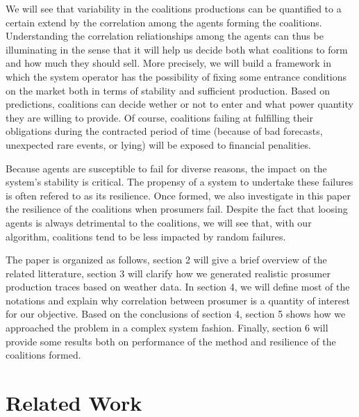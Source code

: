 \documentclass[conference]{IEEEtran}
\begin{document}
We will see that variability in the coalitions productions can be quantified to a certain extend by the correlation among the agents forming the coalitions. Understanding the correlation reliationships among the agents can thus be illuminating in the sense that it will help us decide both what coalitions to form and how much they should sell. More precisely, we will build a framework in which the system operator has the possibility of fixing some entrance conditions on the market both in terms of stability and sufficient production. Based on predictions, coalitions can decide wether or not to enter and what power quantity they are willing to provide. Of course, coalitions failing at fulfilling their obligations during the contracted period of time (because of bad forecasts, unexpected rare events, or lying) will be exposed to financial penalities.

Because agents are susceptible to fail for diverse reasons, the impact on the system's stability is critical. The propensy of a system to undertake these failures is often refered to as its resilience. Once formed, we also investigate in this paper the resilience of the coalitions when prosumers fail. Despite the fact that loosing agents is always detrimental to the coalitions, we will see that, with our algorithm, coalitions tend to be less impacted by random failures.

The paper is organized as follows, section 2 will give a brief overview of the related litterature, section 3 will clarify how we generated realistic prosumer production traces based on weather data. In section 4, we will define most of the notations and explain why correlation between prosumer is a quantity of interest for our objective. Based on the conclusions of section 4, section 5 shows how we approached the problem in a complex system fashion. Finally, section 6 will provide some results both on performance of the method and resilience of the coalitions formed.


%
%

\section{Related Work}
\label{sec:related}
\end{document}
